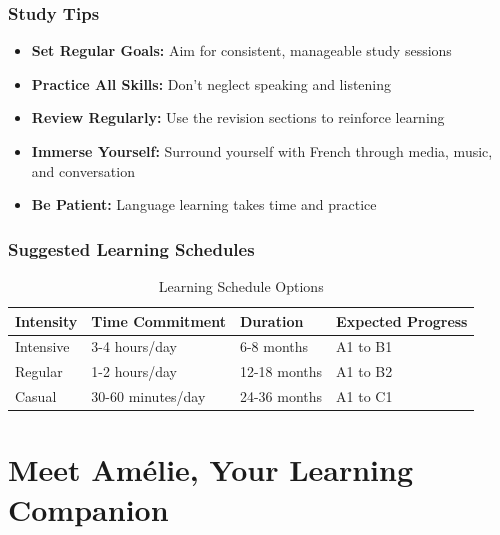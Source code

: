\subsection*{Study Tips}
\begin{itemize}
\item \textbf{Set Regular Goals:} Aim for consistent, manageable study sessions
\item \textbf{Practice All Skills:} Don't neglect speaking and listening
\item \textbf{Review Regularly:} Use the revision sections to reinforce learning
\item \textbf{Immerse Yourself:} Surround yourself with French through media, music, and conversation
\item \textbf{Be Patient:} Language learning takes time and practice
\end{itemize}

\subsection*{Suggested Learning Schedules}

\begin{table}[h]
\centering
\begin{tabular}{l l l l}
\toprule
\textbf{Intensity} & \textbf{Time Commitment} & \textbf{Duration} & \textbf{Expected Progress} \\
\midrule
Intensive & 3-4 hours/day & 6-8 months & A1 to B1 \\
Regular & 1-2 hours/day & 12-18 months & A1 to B2 \\
Casual & 30-60 minutes/day & 24-36 months & A1 to C1 \\
\bottomrule
\end{tabular}
\caption{Learning Schedule Options}
\label{tab:schedule}
\end{table}

\clearpage

\chapter*{Meet Amélie, Your Learning Companion}

\begin{center}

\end{center}

